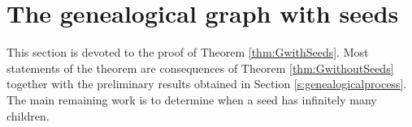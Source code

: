 \documentclass[french]{article}
\renewcommand{\1}{\mathds{1}}
\begin{document}
  


\section{The genealogical graph with seeds}\label{s:Gwithseed}

This section is devoted to the proof of Theorem \ref{thm:GwithSeeds}. Most statements of the theorem are consequences of Theorem \ref{thm:GwithoutSeeds} together with the preliminary results obtained in Section \ref{s:genealogicalprocess}. The main remaining work is to determine when a seed has infinitely many children. 

\medskip
\end{document}
